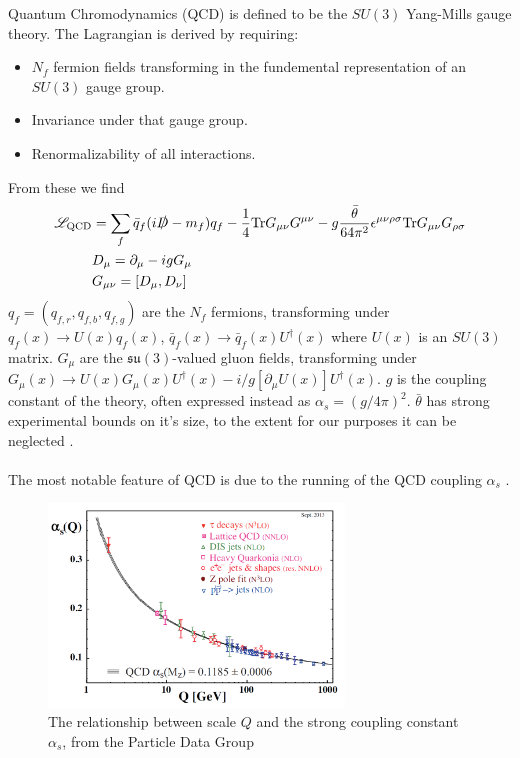 Quantum Chromodynamics (QCD) is defined to be the $SU(3)$ Yang-Mills gauge theory. The Lagrangian is derived by requiring:
\begin{itemize}
\item
  $N_f$ fermion fields transforming in the fundemental representation of  an $SU(3)$ gauge group.
\item
  Invariance under that gauge group.
\item
  Renormalizability of all interactions.
\end{itemize}
From these we find \cite{Schwartz:2013pla}
\begin{align}
  \mathscr{L}_{\text{QCD}} &= \sum_f \bar{q}_f (i \slashed{D} - m_f) q_f - {1\over 4} \text{Tr}G_{\mu\nu} G^{\mu\nu} - g{\bar{\theta}\over 64 \pi^2} \epsilon^{\mu\nu\rho\sigma} \text{Tr}G_{\mu\nu} G_{\rho\sigma} \\
  &D_{\mu} = \partial_{\mu} - i g G_{\mu} \\
  &G_{\mu\nu} = [ D_{\mu}, D_{\nu} ]
\end{align}
$q_f = ( q_{f,r}, q_{f,b}, q_{f,g} )$ are the $N_f$ fermions, transforming under $q_f(x) \to U(x)q_f(x)$, $\bar{q}_f(x) \to \bar{q}_f(x) U^{\dagger}(x)$ where $U(x)$ is an $SU(3)$ matrix. $G_{\mu}$ are the $\mathfrak{su}(3)$-valued gluon fields, transforming under $G_{\mu}(x) \to U(x) G_{\mu}(x) U^{\dagger}(x) - i/g [ \partial_{\mu} U(x) ] U^{\dagger}(x)$. $g$ is the coupling constant of the theory, often expressed instead as $\alpha_s = (g/4\pi)^2$. $\bar{\theta}$ has strong experimental bounds on it's size, to the extent for our purposes it can be neglected \cite{ALTAREV1992242}.
\\ \\
The most notable feature of QCD is due to the running of the QCD coupling $\alpha_s$ \cite{PhysRevLett.30.1343}.
\begin{figure}
  \begin{center}
    \includegraphics[width=0.7\textwidth]{images/QCD-running-coupling.png}
  \end{center}
  \caption{The relationship between scale $Q$ and the strong coupling constant $\alpha_s$, from the Particle Data Group \cite{Patrignani:2016xqp}}
  \label{fig:semileptonic}
\end{figure}
